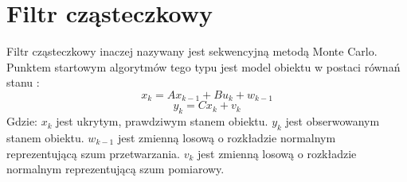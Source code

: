
\section{Filtr cząsteczkowy}
\label{sec:filtrczasteczkowy}

Filtr cząsteczkowy inaczej nazywany jest sekwencyjną metodą Monte Carlo. 
Punktem startowym algorytmów tego typu jest model obiektu w postaci równań stanu \cite{Mukhtar}:
\begin{equation}
\label{eq:PF_state}
x_k=Ax_{k-1}+Bu_k+w_{k-1}
\end{equation}
\begin{equation}
y_k=Cx_k+v_k
\end{equation}
\noindent Gdzie:\newline
\(x_k\) jest ukrytym, prawdziwym stanem obiektu.\newline
\(y_k\) jest obserwowanym stanem obiektu.\newline
\(w_{k-1}\) jest zmienną losową o rozkładzie normalnym reprezentującą szum przetwarzania.\newline
\(v_k\) jest zmienną losową o rozkładzie normalnym reprezentującą szum pomiarowy.\newline

